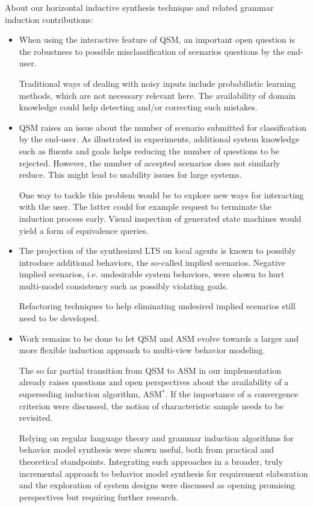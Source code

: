 About our horizontal inductive synthesis technique and related grammar induction contributions:
\begin{itemize}

\item When using the interactive feature of QSM, an important open question is the robustness to possible misclassification of scenarios questions by the end-user. 

Traditional ways of dealing with noisy inputs include probabilistic learning methods, which are not necessary relevant here. The availability of domain knowledge could help detecting and/or correcting such mistakes.

\item QSM raises an issue about the number of scenario submitted for classification by the end-user. As illustrated in experiments, additional system knowledge such as fluents and goals helps reducing the number of questions to be rejected. However, the number of accepted scenarios does not similarly reduce. This might lead to usability issues for large systems.

One way to tackle this problem would be to explore new ways for interacting with the user. The latter could for example request to terminate the induction process early. Visual inspection of generated state machines would yield a form of equivalence queries. 

\item The projection of the synthesized LTS on local agents is known to possibly introduce additional behaviors, the so-called implied scenarios. Negative implied scenarios, i.e. undesirable system behaviors, were shown to hurt multi-model consistency such as possibly violating goals. 

Refactoring techniques to help eliminating undesired implied scenarios still need to be developed.

\item Work remains to be done to let QSM and ASM evolve towards a larger and more flexible induction approach to multi-view behavior modeling.

The so far partial transition from QSM to ASM in our implementation already raises questions and open perspectives about the availability of a superseding induction algorithm, ASM$^*$. If the importance of a convergence criterion were discussed, the notion of characteristic sample needs to be revisited.

Relying on regular language theory and grammar induction algorithms for behavior model synthesis were shown useful, both from practical and theoretical standpoints. Integrating such approaches in a broader, truly incremental approach to behavior model synthesis for requirement elaboration and the exploration of system designs were discussed as opening promising perspectives but requiring further research.

\end{itemize}
